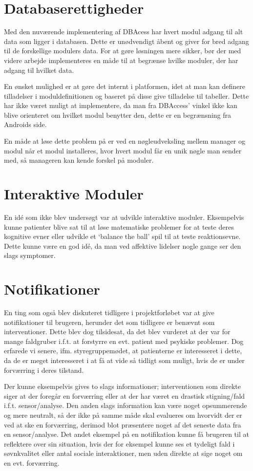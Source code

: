 \section{Databaserettigheder}\label{databaserettigheder}
Med den nuværende implementering af DBAcess har hvert modul adgang til alt data som ligger i databasen.
Dette er unødvendigt åbent og giver for bred adgang til de forskellige modulers data.
For at gøre løsningen mere sikker, bør der med videre arbejde implementeres en måde til at begrænse hvilke moduler, der har adgang til hvilket data.

En ønsket mulighed er at gøre det internt i platformen, idet at man kan definere tilladelser i moduldefinitionen og baseret på disse give tilladelse til tabeller. 
Dette har ikke været muligt at implementere, da man fra DBAccess' vinkel ikke kan blive orienteret om hvilket modul benytter den, dette er en begrænsning fra Androids side.

En måde at løse dette problem på er ved en nøgleudveksling mellem manager og modul når et modul installeres, hvor hvert modul får en unik nøgle man sender med, så manageren kan kende forskel på moduler.


\section{Interaktive Moduler}
En idé som ikke blev undersøgt var at udvikle interaktive moduler.
Eksempelvis kunne patienter blive sat til at løse matematiske problemer for at teste deres kognitive evner eller udvikle et `balance the ball' spil til at teste reaktionsevne.
Dette kunne være en god idé, da man ved affektive lidelser nogle gange ser den slags symptomer.

\section{Notifikationer}
En ting som også blev diskuteret tidligere i projektforløbet var at give notifikationer til brugeren, herunder det som tidligere er benævnt som interventioner.
Dette blev dog tilsidesat, da det blev vurderet at der var for mange faldgruber i.f.t. at forstyrre en evt. patient med psykiske problemer.
Dog erfarede vi senere, ifm. styregruppemødet, at patienterne er interesseret i dette, da de er meget interesseret i at få at vide så tidligt som muligt, hvis de er under forværring i deres tilstand.

Der kunne eksempelvis gives to slags informationer; interventionen som direkte siger at der foregår en forværring eller at der har været en drastisk stigning/fald i.f.t. sensor/analyse.
Den anden slags information kan være noget opsummerende og mere neutralt, så der ikke på samme måde skal evalueres om hvorvidt der er ved at ske en forværring, derimod blot præsentere noget af det seneste data fra en sensor/analyse.
Det andet eksempel på en notifikation kunne få brugeren til at reflektere over sin situation, hvis der for eksempel kunne ses et tydeligt fald i søvnkvalitet eller antal sociale interaktioner, men uden direkte at sige noget om en evt. forværring.

